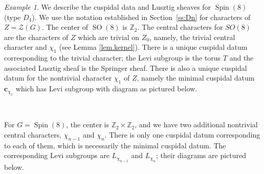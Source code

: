 \documentclass[reqno,11pt]{amsart}
\theoremstyle{remark}
\theoremstyle{remark}
\newtheorem{example}[Thm]{Example}
\theoremstyle{definition}
\theoremstyle{definition}
\theoremstyle{definition}
\numberwithin{equation}{section}
\newcommand{\Z}{\mathbb{ Z}}           %
\newcommand{\SO}{\operatorname{SO}}
\newcommand{\Spin}{\operatorname{Spin}}
\newcommand{\cz}{\mathcal{Z}}
\begin{document}
\begin{example} \label{ex.Spin.even} We describe the cuspidal data and Lusztig sheaves for $\Spin(8)$ (type $D_4$). We use the notation established in Section~\ref{ss:Dn} for characters of $Z=\cz(G)$.   The center of $\SO(8)$ is  $\Z_2$.  The central characters for $SO(8)$ are the characters of $Z$ which are trivial on $Z_0$, namely, the trivial
central character and $ \chi_1$ (see Lemma \ref{lem.kernel}).   
There is a unique cuspidal datum corresponding to the trivial character; the Levi subgroup is the torus $T$ and the associated Lusztig sheaf is the Springer sheaf.
There is also a unique cuspidal datum for the nontrivial character $\chi_1$ of $Z$, namely the minimal cuspidal datum $\mathbf{c}_{\chi_1}$ which has Levi subgroup with diagram as pictured below.
\begin{center}
\\
\end{center}
For $G =\Spin(8)$, the center is $\mathbb Z_2\times \mathbb Z_2$, and we have two additional nontrivial central characters, $\chi_{n-1}$ and $\chi_n$.  There is only one cuspidal datum corresponding to each of them, which is necessarily the minimal cuspidal datum. The corresponding Levi subgroups are $L_{\chi_{n-1}}$ and $L_{\chi_n}$; their
diagrams are pictured below.
\begin{center}
\hspace*{1in}
\end{center}
\end{example}
\end{document}
